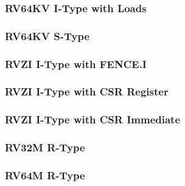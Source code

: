 \subsubsection[{\small RV64KV I-Type with Loads}]{RV64KV I-Type with Loads} \label{sec:format-RV64KV-ILoad}



\subsubsection[{\small RV64KV S-Type}]{RV64KV S-Type} \label{sec:format-RV64KV-SType}



\subsubsection[{\small RVZI I-Type with FENCE.I}]{RVZI I-Type with FENCE.I} \label{sec:format-RVZI-FenceI}



\subsubsection[{\small RVZI I-Type with CSR Register}]{RVZI I-Type with CSR Register} \label{sec:format-RVZI-CSRR}



\subsubsection[{\small RVZI I-Type with CSR Immediate}]{RVZI I-Type with CSR Immediate} \label{sec:format-RVZI-CSRI}



\subsubsection[{\small RV32M R-Type}]{RV32M R-Type} \label{sec:format-RV32M-RType}



\subsubsection[{\small RV64M R-Type}]{RV64M R-Type} \label{sec:format-RV64M-RType}

